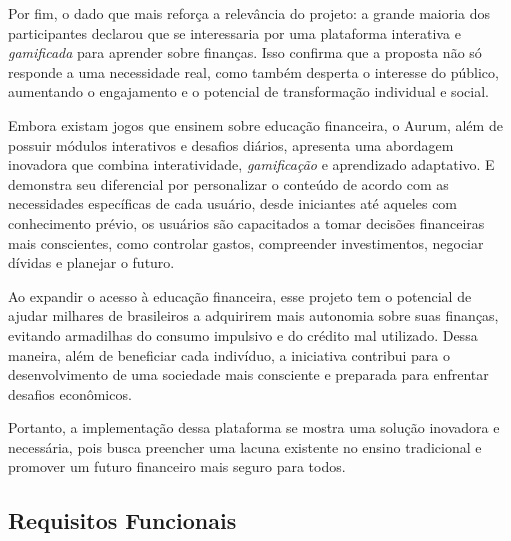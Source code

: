 \documentclass[
	article,			%
	12pt,				%
	oneside,			%
	a4paper,			%
	english,			%
	brazil,				%
	sumario=tradicional
	]{abntex2}
\begin{document}
    Por fim, o dado que mais reforça a relevância do projeto: a grande maioria dos participantes declarou que se interessaria por uma plataforma interativa e \textit{gamificada} para aprender sobre finanças. Isso confirma que a proposta não só responde a uma necessidade real, como também desperta o interesse do público, aumentando o engajamento e o potencial de transformação individual e social.

    Embora existam jogos que ensinem sobre educação financeira, o Aurum, além de possuir módulos interativos e desafios diários, apresenta uma abordagem inovadora que combina interatividade, \textit{gamificação} e aprendizado adaptativo. E demonstra seu diferencial por personalizar o conteúdo de acordo com as necessidades específicas de cada usuário, desde iniciantes até aqueles com conhecimento prévio, os usuários são capacitados a tomar decisões financeiras mais conscientes, como controlar gastos, compreender investimentos, negociar dívidas e planejar o futuro.
    
    Ao expandir o acesso à educação financeira, esse projeto tem o potencial de ajudar milhares de brasileiros a adquirirem mais autonomia sobre suas finanças, evitando armadilhas do consumo impulsivo e do crédito mal utilizado. Dessa maneira, além de beneficiar cada indivíduo, a iniciativa contribui para o desenvolvimento de uma sociedade mais consciente e preparada para enfrentar desafios econômicos.

    Portanto, a implementação dessa plataforma se mostra uma solução inovadora e necessária, pois busca preencher uma lacuna existente no ensino tradicional e promover um futuro financeiro mais seguro para todos.


\subsection{Requisitos Funcionais}
\end{document}
